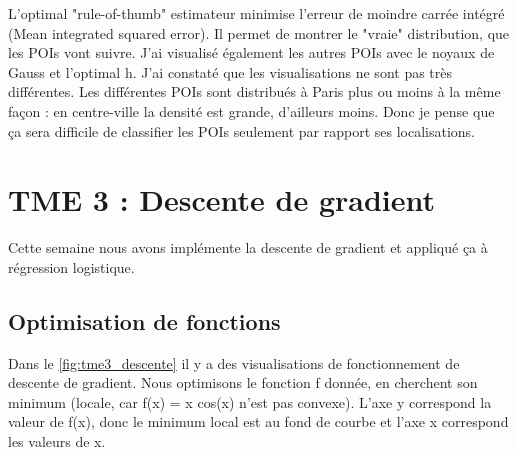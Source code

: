 \documentclass[a4paper,12pt]{article}
\begin{document}
L'optimal "rule-of-thumb" estimateur minimise l'erreur de moindre carrée intégré (Mean integrated squared error). 
Il permet de montrer le "vraie" distribution, que les POIs vont suivre. 
J'ai visualisé également les autres POIs avec le noyaux de Gauss et l'optimal h. 
J'ai constaté que les visualisations ne sont pas très différentes. 
Les différentes POIs sont distribués à Paris plus ou moins à la même façon : 
en centre-ville la densité est grande, d'ailleurs moins. 
Donc je pense que ça sera difficile de classifier les POIs seulement par rapport ses localisations.

\section{TME 3 : Descente de gradient}

Cette semaine nous avons implémente la descente de gradient et appliqué ça à régression logistique.

\subsection{Optimisation de fonctions}

Dans le \autoref{fig:tme3_descente} il y a des visualisations de fonctionnement de descente de gradient. 
Nous optimisons le fonction f donnée, en cherchent son minimum (locale, car f(x) = x cos(x) n'est pas convexe). 
L'axe y correspond la valeur de f(x), donc le minimum local est au fond de courbe et l'axe x correspond les valeurs de x.
\end{document}
